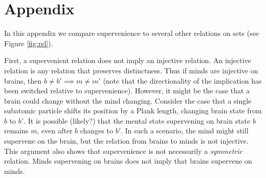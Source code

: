\documentclass{article}
\newcommand{\hL}{\widehat{L}}
\begin{document}






\newpage
\appendix
\section*{Appendix}



In this appendix we compare supervenience to several other relations on sets (see Figure \ref{fig:rel}).



First, a supervenient relation does not imply an injective relation.  An injective relation is any relation that preserves distinctness.  Thus if minds are injective on brains, then $b\neq b' \implies m \neq m'$ (note that the directionality of the implication has been switched relative to supervenience). However, it might be the case that a brain could change without the mind changing.  Consider the case that a single subatomic particle shifts its position by a Plank length, changing brain state from $b$ to $b'$.  It is possible (likely?) that the mental state supervening on brain state $b$ remains $m$, even after $b$ changes to $b'$.  In such a scenario, the mind might still supervene on the brain, but the relation from brains to minds is not injective. This argument also shows that supervenience is not necessarily a \emph{symmetric} relation.  Minds supervening on brains does not imply that brains supervene on minds.  
\end{document}
